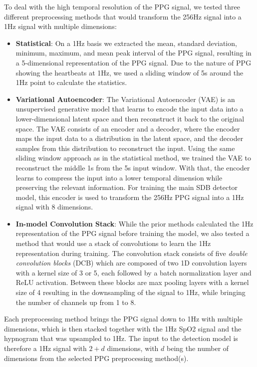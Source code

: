 To deal with the high temporal resolution of the PPG signal, we tested three different preprocessing methods that would transform the 256Hz signal into a 1Hz signal with multiple dimensions:

\begin{itemize}
    \item \textbf{Statistical}: On a 1Hz basis we extracted the mean, standard deviation, minimum, maximum, and mean peak interval of the PPG signal, resulting in a 5-dimensional representation of the PPG signal. Due to the nature of PPG showing the heartbeats at 1Hz, we used a sliding window of 5s around the 1Hz point to calculate the statistics.
    \item \textbf{Variational Autoencoder}: The Variational Autoencoder (VAE) is an unsupervised generative model that learns to encode the input data into a lower-dimensional latent space and then reconstruct it back to the original space. The VAE consists of an encoder and a decoder, where the encoder maps the input data to a distribution in the latent space, and the decoder samples from this distribution to reconstruct the input. Using the same sliding window approach as in the statistical method, we trained the VAE to reconstruct the middle 1s from the 5s input window. With that, the encoder learns to compress the input into a lower temporal dimension while preserving the relevant information. For training the main SDB detector model, this encoder is used to transform the 256Hz PPG signal into a 1Hz signal with 8 dimensions.
    \item \textbf{In-model Convolution Stack}: While the prior methods calculated the 1Hz representation of the PPG signal before training the model, we also tested a method that would use a stack of convolutions to learn the 1Hz representation during training. The convolution stack consists of five \textit{double convolution blocks} (DCB) which are composed of two 1D convolution layers with a kernel size of 3 or 5, each followed by a batch normalization layer and ReLU activation. Between these blocks are max pooling layers with a kernel size of 4 resulting in the downsampling of the signal to 1Hz, while bringing the number of channels up from 1 to 8.
\end{itemize}

Each preprocessing method brings the PPG signal down to 1Hz with multiple dimensions, which is then stacked together with the 1Hz SpO2 signal and the hypnogram that was upsampled to 1Hz. The input to the detection model is therefore a 1Hz signal with $2+d$ dimensions, with $d$ being the number of dimensions from the selected PPG preprocessing method(s). 

